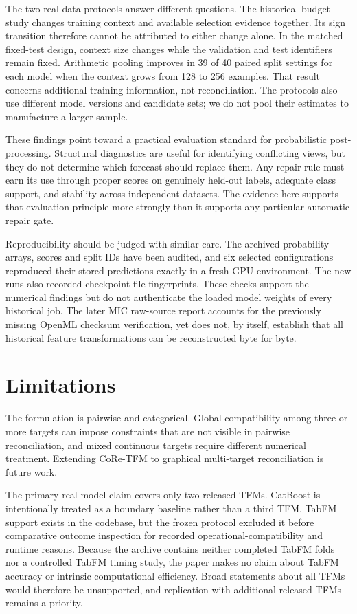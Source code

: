 \documentclass[a4paper,fleqn]{cas-sc}
\begin{document}
The two real-data protocols answer different questions. The historical budget study changes training context and available selection evidence together. Its sign transition therefore cannot be attributed to either change alone. In the matched fixed-test design, context size changes while the validation and test identifiers remain fixed. Arithmetic pooling improves in 39 of 40 paired split settings for each model when the context grows from 128 to 256 examples. That result concerns additional training information, not reconciliation. The protocols also use different model versions and candidate sets; we do not pool their estimates to manufacture a larger sample.

These findings point toward a practical evaluation standard for probabilistic post-processing. Structural diagnostics are useful for identifying conflicting views, but they do not determine which forecast should replace them. Any repair rule must earn its use through proper scores on genuinely held-out labels, adequate class support, and stability across independent datasets. The evidence here supports that evaluation principle more strongly than it supports any particular automatic repair gate.

Reproducibility should be judged with similar care. The archived probability arrays, scores and split IDs have been audited, and six selected configurations reproduced their stored predictions exactly in a fresh GPU environment. The new runs also recorded checkpoint-file fingerprints. These checks support the numerical findings but do not authenticate the loaded model weights of every historical job. The later MIC raw-source report accounts for the previously missing OpenML checksum verification, yet does not, by itself, establish that all historical feature transformations can be reconstructed byte for byte.

\FloatBarrier
\section{Limitations}
The formulation is pairwise and categorical. Global compatibility among three or more targets can impose constraints that are not visible in pairwise reconciliation, and mixed continuous targets require different numerical treatment. Extending CoRe-TFM to graphical multi-target reconciliation is future work.

The primary real-model claim covers only two released TFMs. CatBoost is intentionally treated as a boundary baseline rather than a third TFM. TabFM support exists in the codebase, but the frozen protocol excluded it before comparative outcome inspection for recorded operational-compatibility and runtime reasons. Because the archive contains neither completed TabFM folds nor a controlled TabFM timing study, the paper makes no claim about TabFM accuracy or intrinsic computational efficiency. Broad statements about all TFMs would therefore be unsupported, and replication with additional released TFMs remains a priority.
\end{document}
